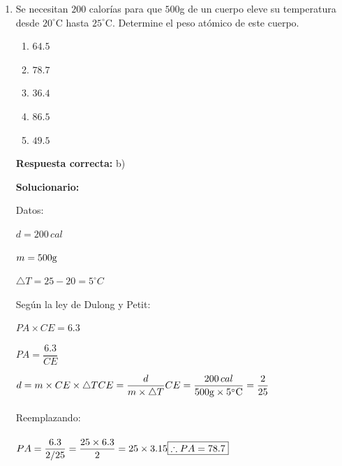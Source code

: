\begin{enumerate}[resume]
	
	\item Se necesitan $200$ calorías para que $500$g de un cuerpo eleve su temperatura desde $20^\circ$C hasta $25^\circ$C. Determine el peso atómico de este cuerpo. 
	\begin{enumerate}[label=\alph*)]
		\item $64.5$
		\item $78.7$
		\item $36.4$
		\item $86.5$
		\item $49.5$
	\end{enumerate}
	
	\textbf{Respuesta correcta:} b)
	
	\vspace{2mm}
	\textbf{Solucionario:}
	
	Datos:
	
	$d=200\,cal$
	
	$m=500 \rm{g}$
	
	$\bigtriangleup T=25-20=5^\circ C$
	
	Según la ley de Dulong y Petit:
	
	$PA \times CE = 6.3$
	
	$PA = \dfrac{{6.3}}{{CE}}$
	
	
	$d=m\times CE\times \bigtriangleup T\\\\
	CE = \dfrac{{d}}{{m\times \bigtriangleup T}}\\\\
	CE = \dfrac{{200\,cal}}{{500 \rm{g}\times 5^\circ C}}=\dfrac{2}{25}$\\\\
	
	Reemplazando:\\\\
	$PA = \dfrac{{6.3}}{{2/25}} = \dfrac{{25 \times 6.3}}{2} = 25 \times 3.15\\\\
	\boxed{{\therefore PA = 78.7}}$
	
	
\end{enumerate}


